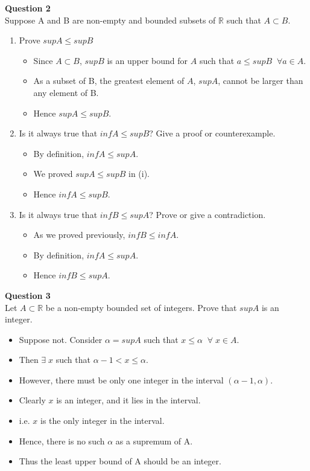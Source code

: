 \documentclass[12pt]{article}
\begin{document}
\vspace{1.5\baselineskip}
\textbf{Question 2}\\
Suppose A and B are non-empty and bounded subsets of $\mathbb{R}$ such that $A \subset B$.
\begin{enumerate}[label=(\roman*)]
    \item Prove $sup A \le sup B$
        
        \begin{itemize}
            \item Since $A \subset B$, $supB$ is an upper bound for $A$ such that $a \le supB\;\;\forall a\in A.$
            \item As a subset of B, the greatest element of $A$, $supA$, cannot be larger than any element of B.
            \item Hence $supA \le supB$.
        \end{itemize}
    
    \item Is it always true that $infA \le supB$? Give a proof or counterexample.
    
        \begin{itemize}
            \item By definition, $infA \le supA$.
            \item We proved $supA\le supB$ in (i).
            \item Hence $infA \le supB$.
        \end{itemize}
        
    \item Is it always true that $infB \le supA$? Prove or give a contradiction.
    
        \begin{itemize}
            \item As we proved previously, $infB \le infA$. 
            \item By definition, $infA \le supA$.
            \item Hence $infB \le supA.$
        \end{itemize}
\end{enumerate}

\newpage
\textbf{Question 3}\\
Let $A \subset \mathbb{R}$ be a non-empty bounded set of integers. Prove that $sup A$ is an integer.

\begin{itemize}
    \item Suppose not. Consider $\alpha = supA$ such that $x \le \alpha\;\; \forall\; x \in A$.
    \item Then $\exists\; x$ such that $\alpha - 1 < x \le \alpha$.
    \item However, there must be only one integer in the interval $(\alpha -1,\alpha)$.
    \item Clearly $x$ is an integer, and it lies in the interval. 
    \item i.e. $x$ is the only integer in the interval.
    \item Hence, there is no such $\alpha$ as a supremum of A.
    \item Thus the least upper bound of A should be an integer.
\end{itemize}
\end{document}
